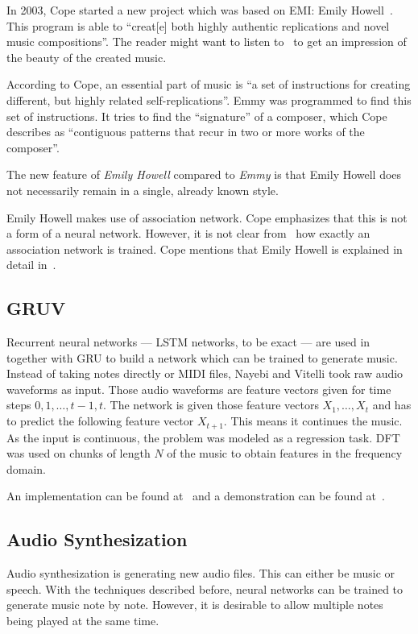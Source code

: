 \documentclass[technote,a4paper,leqno]{IEEEtran}
\begin{document}
In 2003, Cope started a new project which was based on EMI: Emily
Howell~\cite{cope2013well}. This program is able to \enquote{creat[e] both
highly authentic replications and novel music compositions}. The reader might
want to listen to~\cite{Cope2012} to get an impression of the beauty of the
created music.

According to Cope, an essential part of music is \enquote{a set of instructions
for creating different, but highly related self-replications}. Emmy was
programmed to find this set of instructions. It tries to find the
\enquote{signature} of a composer, which Cope describes as \enquote{contiguous
patterns that recur in two or more works of the composer}.

The new feature of \textit{Emily Howell} compared to \textit{Emmy} is that
Emily Howell does not necessarily remain in a single, already known style.

Emily Howell makes use of association network. Cope emphasizes that this is not
a form of a neural network. However, it is not clear from~\cite{cope2013well}
how exactly an association network is trained. Cope mentions that Emily
Howell is explained in detail in~\cite{cope2005computer}.

\subsection{GRUV}

Recurrent neural networks --- \gls{LSTM} networks, to be exact --- are used
in~\cite{nayebigruv} together with \gls{GRU} to build a network which can be
trained to generate music. Instead of taking notes directly or MIDI files,
Nayebi and Vitelli took raw audio waveforms as input. Those audio waveforms are
feature vectors given for time steps $0, 1, \dots, t-1, t$. The network is
given those feature vectors $X_1, \dots, X_t$ and has to predict the following
feature vector $X_{t+1}$. This means it continues the music. As the input is
continuous, the problem was modeled as a regression task. \Gls{DFT} was used on
chunks of length $N$ of the music to obtain features in the frequency domain.

An implementation can be found at~\cite{gruvGitHub} and a demonstration can
be found at~\cite{Vitelli2015}.

\subsection{Audio Synthesization}
Audio synthesization is generating new audio files. This can either be music or
speech. With the techniques described before, neural networks can be trained to
generate music note by note. However, it is desirable to allow multiple notes
being played at the same time.
\end{document}
